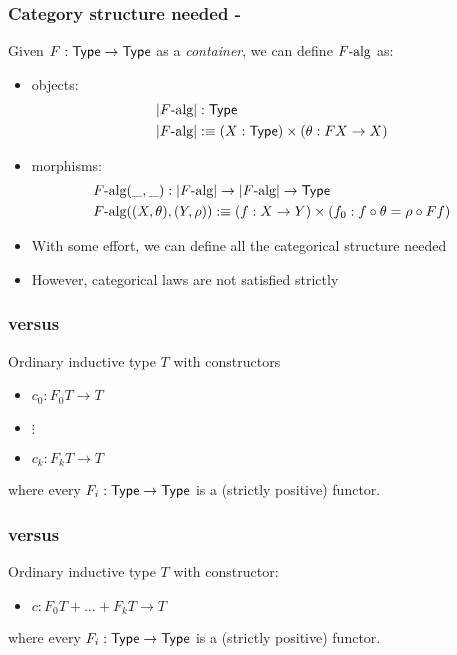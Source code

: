 \documentclass{beamer}
\begin{document}
\begin{frame}
  \frametitle{Category structure needed - \oits}
  
  Given $F : \mathsf{Type} \to \mathsf{Type}$ as a \emph{container}, we can define $F\mbox{-alg}$ as:
  \begin{itemize}
  \item objects:
    \begin{align*}
      &| F\mbox{-alg} | : \mathsf{Type} \\
      &| F\mbox{-alg} | :\equiv (X : \mathsf{Type}) \times (\theta : FX \to X) 
    \end{align*}

  \item morphisms: 
    \begin{align*}
      &F\mbox{-alg}(\_,\_) : | F\mbox{-alg} | \to | F\mbox{-alg} | \to \mathsf{Type} \\
      &F\mbox{-alg}((X,\theta),(Y,\rho)) :\equiv (f : X \to Y) \times (f_0 : f \circ \theta = \rho \circ Ff)
    \end{align*}
  \end{itemize}

  \begin{itemize}
  \item With some effort, we can define all the categorical structure needed
  \item However, categorical laws are not satisfied strictly
  \end{itemize}

\end{frame}

\begin{frame}
  \frametitle{\Hits versus \oits}
Ordinary inductive type $T$ with constructors
\begin{itemize}
  \item $c_0 : F_0 T \to T$
  \item $\vdots$
  \item $c_k : F_k T \to T$
\end{itemize}

where every $F_i : \mathsf{Type} \to \mathsf{Type}$ is a (strictly positive) functor.
\end{frame}

\begin{frame}[noframenumbering]
  \frametitle{\Hits versus \oits}
Ordinary inductive type $T$ with constructor:
\begin{itemize}
  \item $c  : F_0 T + \hdots + F_k T \to T$
\end{itemize}

where every $F_i : \mathsf{Type} \to \mathsf{Type}$ is a (strictly positive) functor.
\end{frame}
\end{document}
